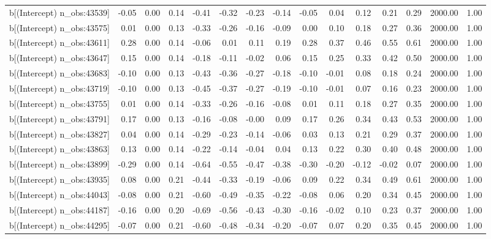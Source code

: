 \begin{table}[ht]
\begin{tabular}{rrrrrrrrrrrrrrr}
  b[(Intercept) n\_obs:43539] & -0.05 & 0.00 & 0.14 & -0.41 & -0.32 & -0.23 & -0.14 & -0.05 & 0.04 & 0.12 & 0.21 & 0.29 & 2000.00 & 1.00 \\ 
  b[(Intercept) n\_obs:43575] & 0.01 & 0.00 & 0.13 & -0.33 & -0.26 & -0.16 & -0.09 & 0.00 & 0.10 & 0.18 & 0.27 & 0.36 & 2000.00 & 1.00 \\ 
  b[(Intercept) n\_obs:43611] & 0.28 & 0.00 & 0.14 & -0.06 & 0.01 & 0.11 & 0.19 & 0.28 & 0.37 & 0.46 & 0.55 & 0.61 & 2000.00 & 1.00 \\ 
  b[(Intercept) n\_obs:43647] & 0.15 & 0.00 & 0.14 & -0.18 & -0.11 & -0.02 & 0.06 & 0.15 & 0.25 & 0.33 & 0.42 & 0.50 & 2000.00 & 1.00 \\ 
  b[(Intercept) n\_obs:43683] & -0.10 & 0.00 & 0.13 & -0.43 & -0.36 & -0.27 & -0.18 & -0.10 & -0.01 & 0.08 & 0.18 & 0.24 & 2000.00 & 1.00 \\ 
  b[(Intercept) n\_obs:43719] & -0.10 & 0.00 & 0.13 & -0.45 & -0.37 & -0.27 & -0.19 & -0.10 & -0.01 & 0.07 & 0.16 & 0.23 & 2000.00 & 1.00 \\ 
  b[(Intercept) n\_obs:43755] & 0.01 & 0.00 & 0.14 & -0.33 & -0.26 & -0.16 & -0.08 & 0.01 & 0.11 & 0.18 & 0.27 & 0.35 & 2000.00 & 1.00 \\ 
  b[(Intercept) n\_obs:43791] & 0.17 & 0.00 & 0.13 & -0.16 & -0.08 & -0.00 & 0.09 & 0.17 & 0.26 & 0.34 & 0.43 & 0.53 & 2000.00 & 1.00 \\ 
  b[(Intercept) n\_obs:43827] & 0.04 & 0.00 & 0.14 & -0.29 & -0.23 & -0.14 & -0.06 & 0.03 & 0.13 & 0.21 & 0.29 & 0.37 & 2000.00 & 1.00 \\ 
  b[(Intercept) n\_obs:43863] & 0.13 & 0.00 & 0.14 & -0.22 & -0.14 & -0.04 & 0.04 & 0.13 & 0.22 & 0.30 & 0.40 & 0.48 & 2000.00 & 1.00 \\ 
  b[(Intercept) n\_obs:43899] & -0.29 & 0.00 & 0.14 & -0.64 & -0.55 & -0.47 & -0.38 & -0.30 & -0.20 & -0.12 & -0.02 & 0.07 & 2000.00 & 1.00 \\ 
  b[(Intercept) n\_obs:43935] & 0.08 & 0.00 & 0.21 & -0.44 & -0.33 & -0.19 & -0.06 & 0.09 & 0.22 & 0.34 & 0.49 & 0.61 & 2000.00 & 1.00 \\ 
  b[(Intercept) n\_obs:44043] & -0.08 & 0.00 & 0.21 & -0.60 & -0.49 & -0.35 & -0.22 & -0.08 & 0.06 & 0.20 & 0.34 & 0.45 & 2000.00 & 1.00 \\ 
  b[(Intercept) n\_obs:44187] & -0.16 & 0.00 & 0.20 & -0.69 & -0.56 & -0.43 & -0.30 & -0.16 & -0.02 & 0.10 & 0.23 & 0.37 & 2000.00 & 1.00 \\ 
  b[(Intercept) n\_obs:44295] & -0.07 & 0.00 & 0.21 & -0.60 & -0.48 & -0.34 & -0.20 & -0.07 & 0.07 & 0.20 & 0.35 & 0.45 & 2000.00 & 1.00 \\ 

\end{tabular}
\end{table}
